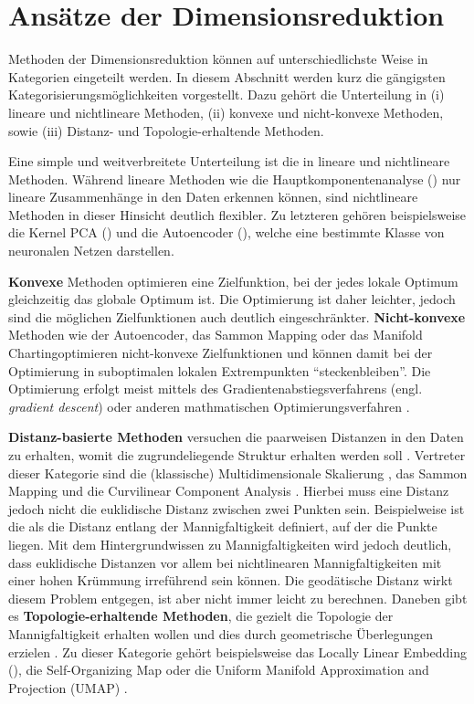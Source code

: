 \section{Ansätze der Dimensionsreduktion}
\label{ch:Dimensionsreduktion:Ansaetze}
Methoden der Dimensionsreduktion können auf unterschiedlichste Weise in Kategorien eingeteilt werden. In diesem Abschnitt werden kurz die gängigsten Kategorisierungsmöglichkeiten vorgestellt. Dazu gehört die Unterteilung in (i) lineare und nichtlineare Methoden, (ii) konvexe und nicht-konvexe Methoden, sowie (iii) Distanz- und Topologie-erhaltende Methoden.

Eine simple und weitverbreitete Unterteilung ist die in lineare und nichtlineare Methoden. Während
lineare Methoden wie die Hauptkomponentenanalyse ()
nur lineare Zusammenhänge in den Daten erkennen können, sind nichtlineare Methoden in dieser
Hinsicht deutlich flexibler. Zu letzteren gehören beispielsweise die Kernel PCA
() und die Autoencoder
(), welche eine bestimmte Klasse von neuronalen Netzen
darstellen.

\textbf{Konvexe} Methoden optimieren eine Zielfunktion, bei der jedes lokale Optimum gleichzeitig das globale Optimum ist. Die Optimierung ist daher leichter, jedoch sind die möglichen Zielfunktionen auch deutlich eingeschränkter. \textbf{Nicht-konvexe} Methoden wie der Autoencoder, das Sammon Mapping oder das Manifold Charting\addref optimieren nicht-konvexe Zielfunktionen und können damit bei der Optimierung in suboptimalen lokalen Extrempunkten \enquote{steckenbleiben}. Die Optimierung erfolgt meist mittels des Gradientenabstiegsverfahrens (engl. \textit{gradient descent}) oder anderen mathmatischen Optimierungsverfahren \parencite[siehe z.B.][]{Guler.2010}.

\textbf{Distanz-basierte Methoden} versuchen die paarweisen Distanzen in den Daten zu erhalten, womit die zugrundeliegende Struktur erhalten werden soll \parencite[3]{Gracia.2014}. Vertreter dieser Kategorie sind die (klassische) Multidimensionale
Skalierung \parencites{Kruskal.1964}{Cox.2008}, das Sammon Mapping \addref und die Curvilinear Component Analysis
\addref. Hierbei muss eine Distanz jedoch nicht die euklidische Distanz zwischen zwei Punkten sein.
Beispielweise ist die  als die Distanz entlang der Mannigfaltigkeit
definiert, auf der die Punkte liegen. Mit dem Hintergrundwissen zu Mannigfaltigkeiten wird jedoch
deutlich, dass euklidische Distanzen vor allem bei nichtlinearen Mannigfaltigkeiten mit einer hohen
Krümmung irreführend sein können. Die geodätische Distanz wirkt diesem Problem entgegen, ist aber
nicht immer leicht zu berechnen. Daneben gibt es \textbf{Topologie-erhaltende Methoden}, die
gezielt die Topologie der Mannigfaltigkeit erhalten wollen und dies durch geometrische Überlegungen
erzielen \parencite[4]{Gracia.2014}. Zu dieser Kategorie gehört beispielsweise das Locally Linear Embedding
(), die Self-Organizing Map \parencite{Kohonen.1990} oder die Uniform Manifold Approximation and Projection (UMAP) \parencite{McInnes.2018}.

